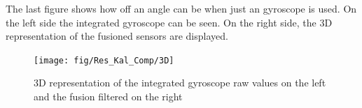 The last figure shows how off an angle can be when just an gyroscope is used. On the left side the integrated gyroscope can be seen. On the right side, the 3D representation of the fusioned sensors are displayed.
\begin{figure}[H]
	\centering\texttt{[image: fig/Res\_Kal\_Comp/3D]}
	\caption[3D representation of Kalman-filtered IMU-Data in MATLAB]{3D representation of the integrated gyroscope raw values on the left and the fusion filtered on the right}
	\label{fig:KalmanFilterResult:3D}
\end{figure}